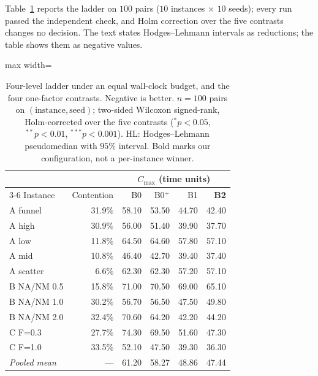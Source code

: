 \documentclass[preprint,review,12pt,authoryear]{elsarticle}
\newcommand{\NCases}{10}
\newcommand{\NSeeds}{10}
\newcommand{\NPairs}{100}
\begin{document}
Table~\ref{tab:main} reports the ladder on $\NPairs$ pairs ($\NCases$ instances $\times$ $\NSeeds$ seeds); every run passed the independent check, and Holm correction over the five contrasts changes no decision.
The text states Hodges--Lehmann intervals as reductions; the table shows them as negative values.

\begin{table}[!htbp]
\caption{Four-level ladder under an equal wall-clock budget, and the four one-factor contrasts. Negative is better.
$n=\NPairs$ pairs on $(\text{instance},\text{seed})$; two-sided Wilcoxon signed-rank, Holm-corrected over the five contrasts
($^{*}p<0.05$, $^{**}p<0.01$, $^{***}p<0.001$). HL: Hodges--Lehmann pseudomedian with $95\%$ interval.
Bold marks our configuration, not a per-instance winner.}
\label{tab:main}
\small
\begin{adjustbox}{max width=\linewidth}\begin{tabular}{@{}lrrrrr@{}}
\toprule
& & \multicolumn{4}{c}{$C_{\max}$ (time units)} \\
\cmidrule(lr){3-6}
Instance & Contention & B0 & B0$^{+}$ & B1 & \textbf{B2} \\
\midrule
A funnel & 31.9\% & 58.10 & 53.50 & 44.70 & 42.40 \\
A high & 30.9\% & 56.00 & 51.40 & 39.90 & 37.70 \\
A low & 11.8\% & 64.50 & 64.60 & 57.80 & 57.10 \\
A mid & 10.8\% & 46.40 & 42.70 & 39.40 & 37.40 \\
A scatter & 6.6\% & 62.30 & 62.30 & 57.20 & 57.10 \\
\midrule
B NA/NM 0.5 & 15.8\% & 71.00 & 70.50 & 69.00 & 65.10 \\
B NA/NM 1.0 & 30.2\% & 56.70 & 56.50 & 47.50 & 49.80 \\
B NA/NM 2.0 & 32.4\% & 70.60 & 64.20 & 42.20 & 44.20 \\
\midrule
C F=0.3 & 27.7\% & 74.30 & 69.50 & 51.60 & 47.30 \\
C F=1.0 & 33.5\% & 52.10 & 47.50 & 39.30 & 36.30 \\
\midrule
\emph{Pooled mean} & --- & 61.20 & 58.27 & 48.86 & 47.44 \\
\bottomrule
\end{tabular}\end{adjustbox}


\end{table}
\end{document}
